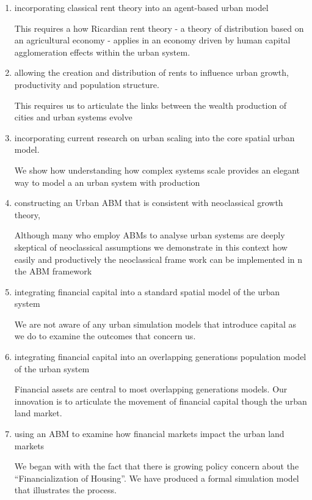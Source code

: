 \begin{enumerate}
    \item incorporating classical rent theory into an agent-based urban model 

This requires a how Ricardian rent theory - a theory of distribution based on an agricultural economy - applies in an economy driven by human capital agglomeration effects within the urban system. 

    \item allowing the creation and distribution of rents to influence urban growth, productivity and  population structure. 
    
This requires us to articulate the links between the wealth production of cities and  urban systems evolve 

    \item incorporating current research on urban scaling into the  core spatial urban model.  

We show how understanding how complex systems scale provides an elegant way to model a an urban system with production

    \item constructing an   Urban ABM that is consistent with neoclassical growth theory,

Although many  who employ ABMs to analyse urban systems are deeply skeptical of neoclassical assumptions we demonstrate in this context how easily and productively the neoclassical frame work can be implemented in n the ABM framework

    \item integrating financial capital into a standard spatial model of the urban system

We are not aware of any urban simulation models that introduce capital as we do to examine the outcomes that concern us.
    
    \item integrating financial capital into an overlapping generations population model of the urban system

Financial assets are central to most overlapping generations models. Our innovation is to articulate the movement of financial capital though the urban land market.
    
    \item using an ABM to examine how financial markets impact the urban land markets 

We began with with the fact that there is growing policy concern about the ``Financialization of  Housing''. We have produced a formal simulation model that illustrates the process. 


\end{enumerate}
